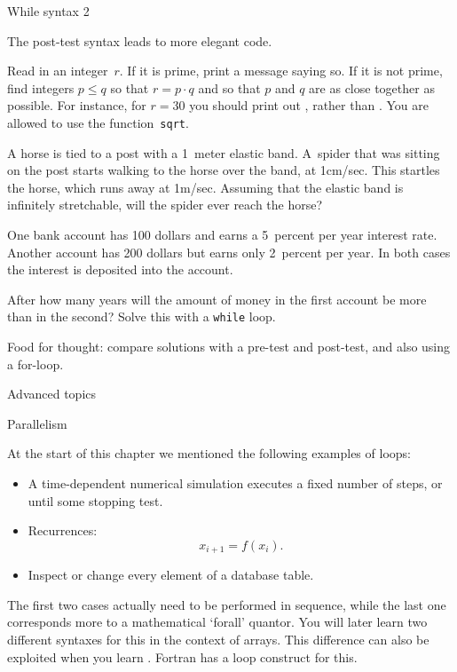 \begin{block}{While syntax 2}
  \label{sl:while3}

  The post-test syntax leads to more elegant code.
\end{block}

\begin{exercise}
  \label{ex:squaregrid}
  Read in an integer~$r$. If it is prime, print a message saying so.
  If it is not prime, find integers $p\leq q$ so that $r=p\cdot q$ and so
  that $p$ and $q$ are as close together as possible.
  For instance, for $r=30$ you should print out , rather than
  . You are allowed to use the function~\lstinline{sqrt}.
\end{exercise}

\begin{exercise}
  \label{ex:horsespider}
  A horse is tied to a post with a 1~meter elastic band. A~spider that
  was sitting on the post starts walking to the horse over the band,
  at 1cm/sec. This startles the horse, which runs away at
  1m/sec. Assuming that the elastic band is infinitely stretchable,
  will the spider ever reach the horse?
\end{exercise}
\begin{exercise}
  \label{ex:interest}
  One bank account has 100 dollars and earns a 5~percent per year interest
  rate. Another account has 200 dollars but earns only 2~percent per
  year. In both cases the interest is deposited into the account.
  
  After how many years will the amount of money in the first account
  be more than in the second? Solve this with a \lstinline{while} loop.

  Food for thought: compare solutions with a pre-test and post-test,
  and also using a for-loop.
\end{exercise}

 {Advanced topics}

 {Parallelism}

At the start of this chapter we mentioned the following examples of loops:
\begin{itemize}
\item A time-dependent numerical simulation executes a fixed number of
  steps, or until some stopping test.
\item Recurrences: \[ x_{i+1} = f(x_i). \]
\item Inspect or change every element of a database table.
\end{itemize}
The first two cases actually need to be performed in sequence, while
the last one corresponds more to a mathematical `forall' quantor. You
will later learn two different syntaxes for this in the context of arrays.
This
difference can also be exploited when you learn
. Fortran has a
 loop construct for this.

